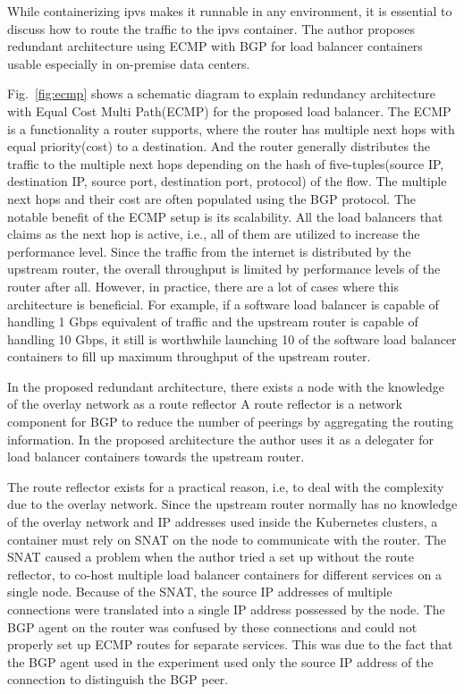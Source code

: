 While containerizing ipvs makes it runnable in any environment, it is essential to discuss how to route the traffic to the ipvs container.
The author proposes redundant architecture using ECMP with BGP for load balancer containers usable especially in on-premise data centers.

Fig.~\ref{fig:ecmp} shows a schematic diagram to explain redundancy architecture with Equal Cost Multi Path(ECMP) for the proposed load balancer.
%
The ECMP is a functionality a router supports, where the router has multiple next hops with equal priority(cost) to a destination.
And the router generally distributes the traffic to the multiple next hops depending on the hash of five-tuples(source IP, destination IP, source port, destination port, protocol) of the flow.
The multiple next hops and their cost are often populated using the BGP protocol.
%
The notable benefit of the ECMP setup is its scalability.
All the load balancers that claims as the next hop is active, i.e., all of them are utilized to increase the performance level.
Since the traffic from the internet is distributed by the upstream router, the overall throughput is limited by performance levels of the router after all.
However, in practice, there are a lot of cases where this architecture is beneficial.
For example, if a software load balancer is capable of handling 1 Gbps equivalent of traffic and the upstream router is capable of handling 10 Gbps, it still is worthwhile launching 10 of the software load balancer containers to fill up maximum throughput of the upstream router.

%
In the proposed redundant architecture, there exists a node with the knowledge of the overlay network as a route reflector
A route reflector is a network component for BGP to reduce the number of peerings by aggregating the routing information\cite{rfc4456}.
In the proposed architecture the author uses it as a delegater for load balancer containers towards the upstream router.

The route reflector exists for a practical reason, i.e, to deal with the complexity due to the overlay network.
Since the upstream router normally has no knowledge of the overlay network and IP addresses used inside the Kubernetes clusters, a container must rely on SNAT on the node to communicate with the router.
The SNAT caused a problem when the author tried a set up without the route reflector, to co-host multiple load balancer containers for different services on a single node.
Because of the SNAT, the source IP addresses of multiple connections were translated into a single IP address possessed by the node.
The BGP agent on the router was confused by these connections and could not properly set up ECMP routes for separate services.
This was due to the fact that the BGP agent used in the experiment used only the source IP address of the connection to distinguish the BGP peer.

